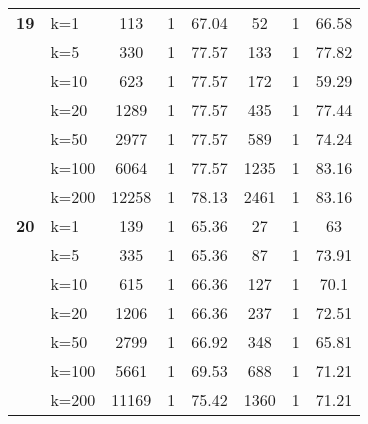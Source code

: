 \begin{table}[htbp]
\begin{tabular}{|l|l|c|c|c|c|c|c|}
    \multicolumn{1}{|r|}{\textbf{19}} & k=1 & 113 & 1 & 67.04 & 52 & 1 & 66.58 \\ 
     & k=5 & 330 & 1 & 77.57 & 133 & 1 & 77.82 \\ 
     & k=10 & 623 & 1 & 77.57 & 172 & 1 & 59.29 \\ 
     & k=20 & 1289 & 1 & 77.57 & 435 & 1 & 77.44 \\ 
     & k=50 & 2977 & 1 & 77.57 & 589 & 1 & 74.24 \\ 
     & k=100 & 6064 & 1 & 77.57 & 1235 & 1 & 83.16 \\ 
     & k=200 & 12258 & 1 & 78.13 & 2461 & 1 & 83.16 \\ \hline
    \multicolumn{1}{|r|}{\textbf{20}} & k=1 & 139 & 1 & 65.36 & 27 & 1 & 63 \\ 
     & k=5 & 335 & 1 & 65.36 & 87 & 1 & 73.91 \\ 
     & k=10 & 615 & 1 & 66.36 & 127 & 1 & 70.1 \\ 
     & k=20 & 1206 & 1 & 66.36 & 237 & 1 & 72.51 \\ 
     & k=50 & 2799 & 1 & 66.92 & 348 & 1 & 65.81 \\ 
     & k=100 & 5661 & 1 & 69.53 & 688 & 1 & 71.21 \\ 
     & k=200 & 11169 & 1 & 75.42 & 1360 & 1 & 71.21 \\ \hline
    \end{tabular}
\end{table}
